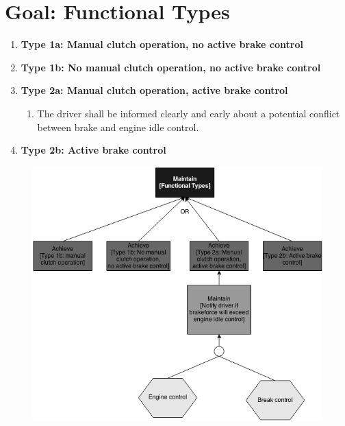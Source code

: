 \section{Goal: Functional Types}

	\begin{enumerate}
		\item {\bf Type 1a: Manual clutch operation, no active brake control}
		\item {\bf Type 1b: No manual clutch operation, no active brake control}
		\item {\bf Type 2a: Manual clutch operation, active brake control}
			\begin{enumerate}[label*=\arabic*.]
				\item The driver shall be informed clearly and early about a potential 
				conflict between brake and engine idle control. 
			\end{enumerate}
		\item {\bf Type 2b: Active brake control}
	\end{enumerate}

	\begin{figure}[H]
		\includegraphics[width=\textwidth]{pics/FunctionalTypes.png}
	\end{figure}